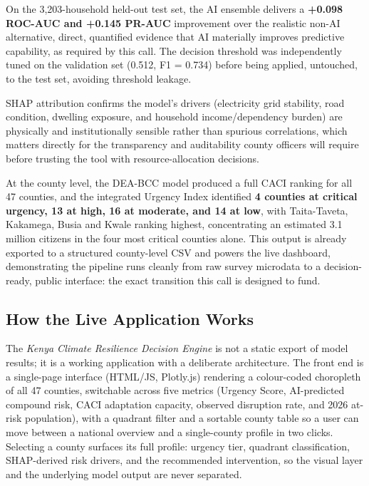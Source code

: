 \documentclass[12pt,a4paper]{article}
\begin{document}
On the 3,203-household held-out test set, the AI ensemble delivers a \textbf{+0.098 ROC-AUC and +0.145 PR-AUC} improvement over the realistic non-AI alternative, direct, quantified evidence that AI materially improves predictive capability, as required by this call. The decision threshold was independently tuned on the validation set (0.512, F1 = 0.734) before being applied, untouched, to the test set, avoiding threshold leakage.

SHAP attribution confirms the model's drivers (electricity grid stability, road condition, dwelling exposure, and household income/dependency burden) are physically and institutionally sensible rather than spurious correlations, which matters directly for the transparency and auditability county officers will require before trusting the tool with resource-allocation decisions.

At the county level, the DEA-BCC model produced a full CACI ranking for all 47 counties, and the integrated Urgency Index identified \textbf{4 counties at critical urgency, 13 at high, 16 at moderate, and 14 at low}, with Taita-Taveta, Kakamega, Busia and Kwale ranking highest, concentrating an estimated 3.1 million citizens in the four most critical counties alone. This output is already exported to a structured county-level CSV and powers the live dashboard, demonstrating the pipeline runs cleanly from raw survey microdata to a decision-ready, public interface: the exact transition this call is designed to fund.

\subsection{How the Live Application Works}
The \emph{Kenya Climate Resilience Decision Engine} is not a static export of model results; it is a working application with a deliberate architecture. The front end is a single-page interface (HTML/JS, Plotly.js) rendering a colour-coded choropleth of all 47 counties, switchable across five metrics (Urgency Score, AI-predicted compound risk, CACI adaptation capacity, observed disruption rate, and 2026 at-risk population), with a quadrant filter and a sortable county table so a user can move between a national overview and a single-county profile in two clicks. Selecting a county surfaces its full profile: urgency tier, quadrant classification, SHAP-derived risk drivers, and the recommended intervention, so the visual layer and the underlying model output are never separated.
\end{document}

